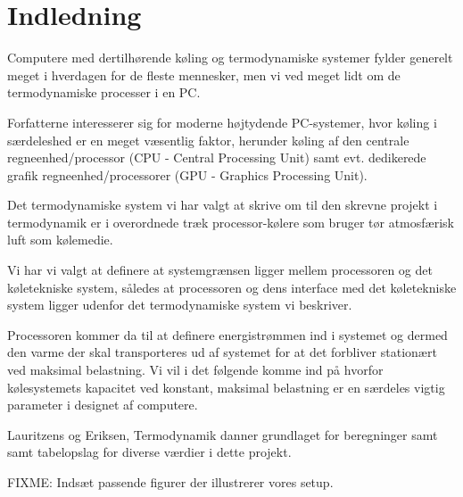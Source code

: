 \section{Indledning}

Computere med dertilhørende køling og termodynamiske systemer fylder generelt meget i hverdagen for de fleste mennesker, men vi ved meget lidt om de termodynamiske processer i en PC.

Forfatterne interesserer sig for moderne højtydende PC-systemer, hvor køling i særdeleshed er en meget væsentlig faktor, herunder køling af den centrale regneenhed/processor (CPU - Central Processing Unit) samt evt. dedikerede grafik regneenhed/processorer (GPU - Graphics Processing Unit).

Det termodynamiske system vi har valgt at skrive om til den skrevne projekt i termodynamik er i overordnede træk processor-kølere som bruger tør atmosfærisk luft som kølemedie.

Vi har vi valgt at definere at systemgrænsen ligger mellem processoren og det køletekniske system, således at processoren og dens interface med det køletekniske system ligger udenfor det termodynamiske system vi beskriver.

Processoren kommer da til at definere energistrømmen ind i systemet og dermed den varme der skal transporteres ud af systemet for at det forbliver stationært ved maksimal belastning. Vi vil i det følgende komme ind på hvorfor kølesystemets kapacitet ved konstant, maksimal belastning er en særdeles vigtig parameter i designet af computere.

Lauritzens og Eriksen, Termodynamik danner grundlaget for beregninger samt samt tabelopslag for diverse værdier i dette projekt.

FIXME:
Indsæt passende figurer der illustrerer vores setup.